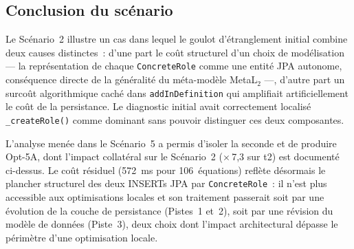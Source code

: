 \subsection{Conclusion du scénario}
Le Scénario~2 illustre un cas dans lequel le goulot d'étranglement initial combine deux causes distinctes~: d'une part le coût structurel d'un choix de modélisation --- la représentation de chaque \texttt{ConcreteRole} comme une entité JPA autonome, conséquence directe de la généralité du méta-modèle MetaL$_2$ ---, d'autre part un surcoût algorithmique caché dans \texttt{addInDefinition} qui amplifiait artificiellement le coût de la persistance. Le diagnostic initial avait correctement localisé \texttt{\_createRole()} comme dominant sans pouvoir distinguer ces deux composantes.

L'analyse menée dans le Scénario~5 a permis d'isoler la seconde et de produire Opt-5A, dont l'impact collatéral sur le Scénario~2 ($\times$\,7,3 sur t2) est documenté ci-dessus. Le coût résiduel (572~ms pour 106~équations) reflète désormais le plancher structurel des deux INSERTs JPA par \texttt{ConcreteRole}~: il n'est plus accessible aux optimisations locales et son traitement passerait soit par une évolution de la couche de persistance (Pistes~1 et~2), soit par une révision du modèle de données (Piste~3), deux choix dont l'impact architectural dépasse le périmètre d'une optimisation locale.


